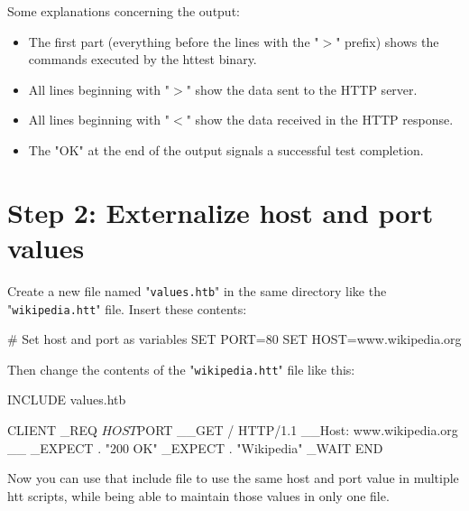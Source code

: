 Some explanations concerning the output:

\begin{itemize}
\item The first part (everything before the lines with the "$>$" prefix)
      shows the commands executed by the httest binary.
\item All lines beginning with "$>$" show the data sent to the HTTP server.
\item All lines beginning with "$<$" show the data received in the HTTP response.
\item The "OK" at the end of the output signals a successful test completion.
\end{itemize}

\newpage
\section{Step 2: Externalize host and port values} 

Create a new file named "\texttt{values.htb}" in the same directory like the 
"\texttt{wikipedia.htt}" file. Insert these contents:

\begin{usplisting}
    # Set host and port as variables
    SET PORT=80
    SET HOST=www.wikipedia.org
\end{usplisting}

Then change the contents of the "\texttt{wikipedia.htt}" file like this:

\begin{usplisting}
    INCLUDE values.htb
    
    CLIENT
    _REQ $HOST $PORT
    __GET / HTTP/1.1
    __Host: www.wikipedia.org
    __
    _EXPECT . "200 OK"
    _EXPECT . "Wikipedia"
    _WAIT
    END
\end{usplisting}

Now you can use that include file to use the same host and port value 
in multiple htt scripts, while being able to maintain those values in 
only one file.

